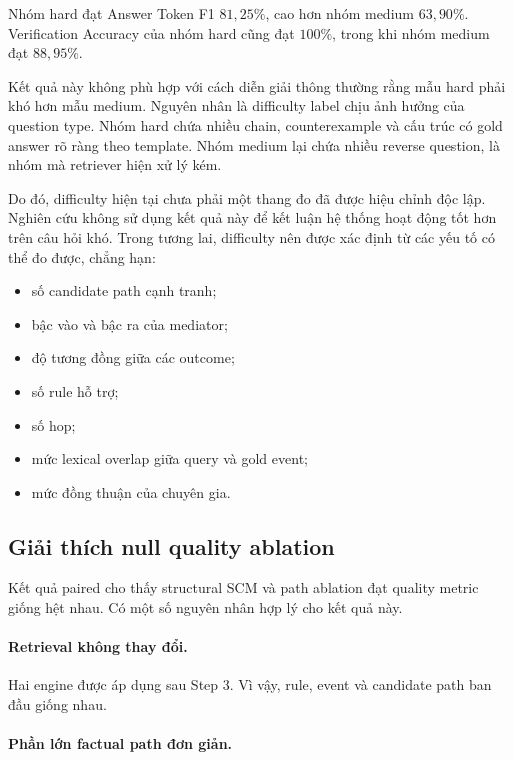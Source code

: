 Nhóm hard đạt Answer Token F1 \(81{,}25\%\), cao hơn nhóm medium
\(63{,}90\%\). Verification Accuracy của nhóm hard cũng đạt \(100\%\), trong
khi nhóm medium đạt \(88{,}95\%\).

Kết quả này không phù hợp với cách diễn giải thông thường rằng mẫu hard phải
khó hơn mẫu medium. Nguyên nhân là difficulty label chịu ảnh hưởng của
question type. Nhóm hard chứa nhiều chain, counterexample và cấu trúc có gold
answer rõ ràng theo template. Nhóm medium lại chứa nhiều reverse question,
là nhóm mà retriever hiện xử lý kém.

Do đó, difficulty hiện tại chưa phải một thang đo đã được hiệu chỉnh độc lập.
Nghiên cứu không sử dụng kết quả này để kết luận hệ thống hoạt động tốt hơn
trên câu hỏi khó. Trong tương lai, difficulty nên được xác định từ các yếu
tố có thể đo được, chẳng hạn:

\begin{itemize}
    \item số candidate path cạnh tranh;
    \item bậc vào và bậc ra của mediator;
    \item độ tương đồng giữa các outcome;
    \item số rule hỗ trợ;
    \item số hop;
    \item mức lexical overlap giữa query và gold event;
    \item mức đồng thuận của chuyên gia.
\end{itemize}

\subsection{Giải thích null quality ablation}

Kết quả paired cho thấy structural SCM và path ablation đạt quality metric
giống hệt nhau. Có một số nguyên nhân hợp lý cho kết quả này.

\paragraph{Retrieval không thay đổi.}

Hai engine được áp dụng sau Step 3. Vì vậy, rule, event và candidate path ban
đầu giống nhau.

\paragraph{Phần lớn factual path đơn giản.}

